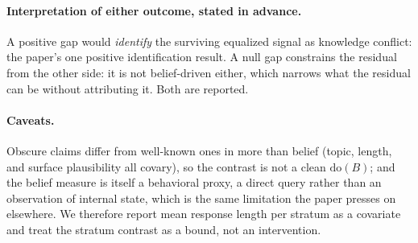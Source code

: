 \paragraph{Interpretation of either outcome, stated in advance.} A positive gap would \emph{identify} the surviving equalized signal as knowledge conflict: the paper's one positive identification result. A null gap constrains the residual from the other side: it is not belief-driven either, which narrows what the residual can be without attributing it. Both are reported.

\paragraph{Caveats.} Obscure claims differ from well-known ones in more than belief (topic, length, and surface plausibility all covary), so the contrast is not a clean $\mathrm{do}(B)$; and the belief measure is itself a behavioral proxy, a direct query rather than an observation of internal state, which is the same limitation the paper presses on elsewhere. We therefore report mean response length per stratum as a covariate and treat the stratum contrast as a bound, not an intervention.

